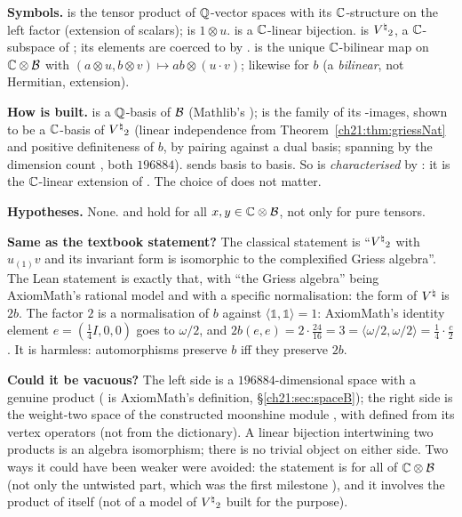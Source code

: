 \begin{dictionary}
\textbf{Symbols.}   is the tensor product of ${\mathbb{Q}}$-vector spaces with its
${\mathbb{C}}$-structure on the left factor (extension of scalars);  is $1\otimes u$.
 is a ${\mathbb{C}}$-linear bijection.   is ${V^{\natural}}_2$, a ${\mathbb{C}}$-subspace of
; its elements are coerced to  by .
 is the unique ${\mathbb{C}}$-bilinear map on ${\mathbb{C}}\otimes\mathcal{B}$ with
$(a\otimes u,b\otimes v)\mapsto ab\otimes(u\cdot v)$; 
likewise for $b$ (a \emph{bilinear}, not Hermitian, extension).

\textbf{How  is built.}   is a ${\mathbb{Q}}$-basis of $\mathcal{B}$ (Mathlib's
);  is the family of its -images, shown to be a
${\mathbb{C}}$-basis of ${V^{\natural}}_2$ (linear independence from Theorem~\ref{ch21:thm:griessNat} and positive
definiteness of $b$, by pairing against a dual basis; spanning by the dimension count
, both $196884$).
 sends basis to basis.  So  is \emph{characterised} by
: it is the ${\mathbb{C}}$-linear extension of .  The choice of
 does not matter.

\textbf{Hypotheses.}  None.   and  hold for all
$x,y\in{\mathbb{C}}\otimes\mathcal{B}$, not only for pure tensors.

\textbf{Same as the textbook statement?}  The classical statement is ``${V^{\natural}}_2$ with $u_{(1)}v$ and its
invariant form is isomorphic to the complexified Griess algebra''.  The Lean statement is exactly that,
with ``the Griess algebra'' being AxiomMath's rational model and with a specific normalisation:
the form of ${V^{\natural}}$ is $2b$.  The factor $2$ is a normalisation of $b$ against
$\langle\mathbb1,\mathbb1\rangle=1$: AxiomMath's identity element $e=(\tfrac14I,0,0)$ goes to
$\omega/2$, and $2b(e,e)=2\cdot\tfrac{24}{16}=3=\langle\omega/2,\omega/2\rangle=\tfrac14\cdot\tfrac c2$.
It is harmless: automorphisms preserve $b$ iff they preserve $2b$.

\textbf{Could it be vacuous?}  The left side is a $196884$-dimensional space with a genuine product
( is AxiomMath's definition, \S\ref{ch21:sec:spaceB}); the right side is the weight-two space
of the constructed moonshine module , with  defined from its vertex
operators (not from the dictionary).  A linear bijection intertwining two products is an algebra
isomorphism; there is no trivial object on either side.  Two ways it could have been weaker were
avoided: the statement is for all of ${\mathbb{C}}\otimes\mathcal{B}$ (not only the untwisted part, which was the first
milestone ), and it involves the product of  itself (not of a
model of ${V^{\natural}}_2$ built for the purpose).


\end{dictionary}
